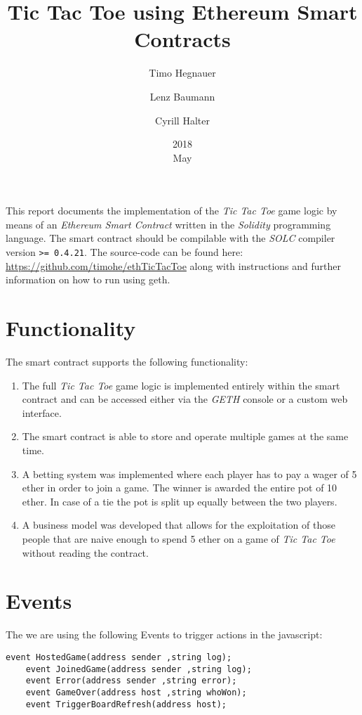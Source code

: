 \documentclass[10pt]{article}
\title{Tic Tac Toe using Ethereum Smart Contracts}
\date{2018\\ May}
\author{Timo Hegnauer
\and Lenz Baumann
\and Cyrill Halter}
\begin{document}
\maketitle
This report documents the implementation of the \emph{Tic Tac Toe} game logic by means of an \emph{Ethereum Smart Contract} written in the \emph{Solidity} programming language. The smart contract should be compilable with the \emph{SOLC} compiler version \texttt{>= 0.4.21}.
\newline The source-code can be found here: \url{https://github.com/timohe/ethTicTacToe} along with instructions and further information on how to run using geth.

\section{Functionality}
The smart contract supports the following functionality:
\begin{enumerate}
	\item The full \emph{Tic Tac Toe} game logic is implemented entirely within the smart contract and can be accessed either via the \emph{GETH} console or a custom web interface.
	\item The smart contract is able to store and operate multiple games at the same time.
	\item A betting system was implemented where each player has to pay a wager of 5 ether in order to join a game. The winner is awarded the entire pot of 10 ether. In case of a tie the pot is split up equally between the two players.
	\item A business model was developed that allows for the exploitation of those people that are naive enough to spend 5 ether on a game of \emph{Tic Tac Toe} without reading the contract.
\end{enumerate}

\section{Events}

The we are using the following Events to trigger actions in the javascript:

\begin{Verbatim}[fontsize=\small]
    event HostedGame(address sender ,string log);
    event JoinedGame(address sender ,string log);
    event Error(address sender ,string error);
    event GameOver(address host ,string whoWon);
    event TriggerBoardRefresh(address host);
\end{Verbatim}
\end{document}
